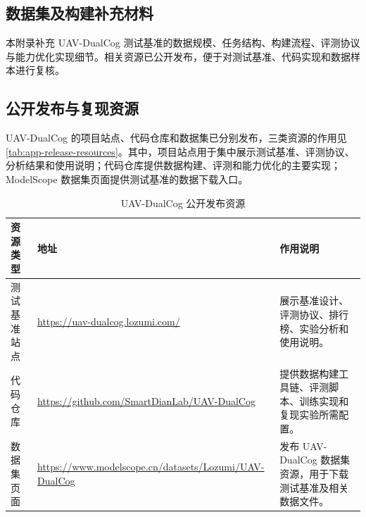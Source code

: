 
\begin{thesisappendix}
\section{数据集及构建补充材料}
\label{app:dataset-construction}

本附录补充 UAV-DualCog 测试基准的数据规模、任务结构、构建流程、评测协议与能力优化实现细节。相关资源已公开发布，便于对测试基准、代码实现和数据样本进行复核。

\subsection{公开发布与复现资源}
\label{app:release-resources}

UAV-DualCog 的项目站点、代码仓库和数据集已分别发布，三类资源的作用见\autoref{tab:app-release-resources}。其中，项目站点用于集中展示测试基准、评测协议、分析结果和使用说明；代码仓库提供数据构建、评测和能力优化的主要实现；ModelScope 数据集页面提供测试基准的数据下载入口。

\begin{table}[htbp]
    \centering
    \caption{UAV-DualCog 公开发布资源}
    \label{tab:app-release-resources}
    \small
    \begin{tabularx}{\textwidth}{@{}U{2.5cm}X X@{}}
        \toprule
        资源类型 & 地址 & 作用说明 \\
        \midrule
        测试基准站点 & \url{https://uav-dualcog.lozumi.com/} & 展示基准设计、评测协议、排行榜、实验分析和使用说明。 \\
        代码仓库 & \url{https://github.com/SmartDianLab/UAV-DualCog} & 提供数据构建工具链、评测脚本、训练实现和复现实验所需配置。 \\
        数据集页面 & \url{https://www.modelscope.cn/datasets/Lozumi/UAV-DualCog} & 发布 UAV-DualCog 数据集资源，用于下载测试基准及相关数据文件。 \\
        \bottomrule
    \end{tabularx}
\end{table}


\end{thesisappendix}
